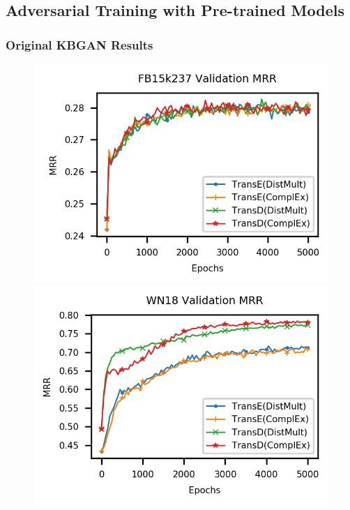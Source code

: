 \subsection{Adversarial Training with Pre-trained Models} \label{app:subsec:adv_training}
\subsubsection{Original KBGAN Results}
\label{sec:appendix:originalkbganresults}
\begin{figure}
    \centering
    \begin{minipage}{.3\textwidth}
      \centering
      \includegraphics[width=0.9\linewidth]{appendices/figures/original_results/FB15k237_MRR.png}
    \end{minipage}%
    \begin{minipage}{.3\textwidth}
      \centering
      \includegraphics[width=\linewidth]{appendices/figures/original_results/WN18_MRR.png}

\end{minipage}
\end{figure}
